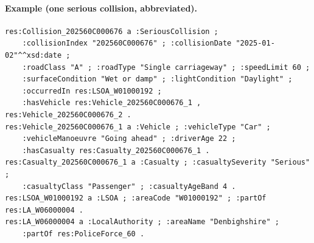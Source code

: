 \documentclass[10.5pt,a4paper]{article}
\begin{document}
\paragraph{Example (one serious collision, abbreviated).}
\begin{verbatim}
res:Collision_202560C000676 a :SeriousCollision ;
    :collisionIndex "202560C000676" ; :collisionDate "2025-01-02"^^xsd:date ;
    :roadClass "A" ; :roadType "Single carriageway" ; :speedLimit 60 ;
    :surfaceCondition "Wet or damp" ; :lightCondition "Daylight" ;
    :occurredIn res:LSOA_W01000192 ;
    :hasVehicle res:Vehicle_202560C000676_1 , res:Vehicle_202560C000676_2 .
res:Vehicle_202560C000676_1 a :Vehicle ; :vehicleType "Car" ;
    :vehicleManoeuvre "Going ahead" ; :driverAge 22 ;
    :hasCasualty res:Casualty_202560C000676_1 .
res:Casualty_202560C000676_1 a :Casualty ; :casualtySeverity "Serious" ;
    :casualtyClass "Passenger" ; :casualtyAgeBand 4 .
res:LSOA_W01000192 a :LSOA ; :areaCode "W01000192" ; :partOf res:LA_W06000004 .
res:LA_W06000004 a :LocalAuthority ; :areaName "Denbighshire" ;
    :partOf res:PoliceForce_60 .
\end{verbatim}
\end{document}
